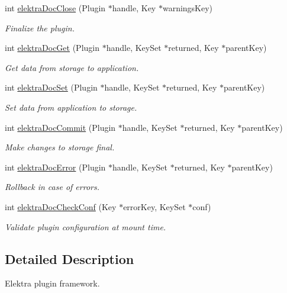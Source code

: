 \begin{DoxyCompactItemize}
int \mbox{\hyperlink{group__plugin_ga1236aefe5b2baf8b7bf636ba5aa9ea29}{elektra\+Doc\+Close}} (Plugin $\ast$handle, Key $\ast$warnings\+Key)
\begin{DoxyCompactList}\small\item\em Finalize the plugin. \end{DoxyCompactList}\item 
int \mbox{\hyperlink{group__plugin_gacb69f3441c6d84241b4362f958fbe313}{elektra\+Doc\+Get}} (Plugin $\ast$handle, Key\+Set $\ast$returned, Key $\ast$parent\+Key)
\begin{DoxyCompactList}\small\item\em Get data from storage to application. \end{DoxyCompactList}\item 
int \mbox{\hyperlink{group__plugin_gae65781a1deb34efc79c8cb9d9174842c}{elektra\+Doc\+Set}} (Plugin $\ast$handle, Key\+Set $\ast$returned, Key $\ast$parent\+Key)
\begin{DoxyCompactList}\small\item\em Set data from application to storage. \end{DoxyCompactList}\item 
int \mbox{\hyperlink{group__plugin_ga52807469897b8acbada5bcc6b8c8ceab}{elektra\+Doc\+Commit}} (Plugin $\ast$handle, Key\+Set $\ast$returned, Key $\ast$parent\+Key)
\begin{DoxyCompactList}\small\item\em Make changes to storage final. \end{DoxyCompactList}\item 
int \mbox{\hyperlink{group__plugin_gad74b35f558ac7c3262f6069c5c47dc79}{elektra\+Doc\+Error}} (Plugin $\ast$handle, Key\+Set $\ast$returned, Key $\ast$parent\+Key)
\begin{DoxyCompactList}\small\item\em Rollback in case of errors. \end{DoxyCompactList}\item 
int \mbox{\hyperlink{group__plugin_ga1c8702efe0f3853c2d7ecca0889f78e8}{elektra\+Doc\+Check\+Conf}} (Key $\ast$error\+Key, Key\+Set $\ast$conf)
\begin{DoxyCompactList}\small\item\em Validate plugin configuration at mount time. \end{DoxyCompactList}\end{DoxyCompactItemize}


\subsection{Detailed Description}
Elektra plugin framework. 


